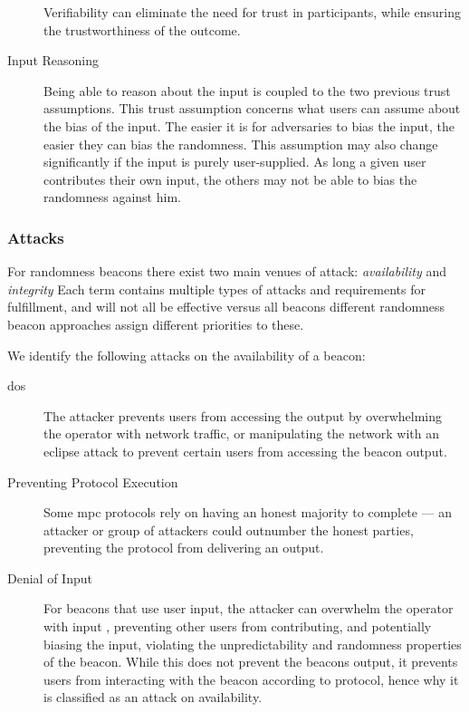 \begin{description}
        Verifiability can eliminate the need for trust in participants, while ensuring the trustworthiness of the outcome.

    \item[Input Reasoning]
        Being able to reason about the input is coupled to the two previous trust assumptions.
This trust assumption concerns what users can assume about the bias of the input.
        The easier it is for adversaries to bias the input, the easier they can bias the randomness.
        This assumption may also change significantly if the input is purely user-supplied.
As long a given user contributes their own input, the others may not be able to bias the randomness against him.

\end{description}


\subsubsection{Attacks}\label{ssub:security_objectives}
For randomness beacons there exist two main venues of attack: \emph{availability} and \emph{integrity}
Each term contains multiple types of attacks and requirements for fulfillment, and will not all be effective versus all beacons different randomness beacon approaches assign different priorities to these.

We identify the following attacks on the availability of a beacon:

\begin{description}
    \item[\Acrfull{dos}] The attacker prevents users from accessing the output by overwhelming the operator  with network traffic, or manipulating the network with an eclipse attack  to prevent certain users from accessing the beacon output.
    \item[Preventing Protocol Execution] Some \gls{mpc} protocols  rely on having an honest majority to complete  --- an attacker or group of attackers could outnumber the honest parties, preventing the protocol from delivering an output.
    \item[Denial of Input] For beacons that use user input, the attacker can overwhelm the operator with input , preventing other users from contributing, and potentially biasing the input, violating the unpredictability and randomness properties of the beacon.
        While this does not prevent the beacons output, it prevents users from interacting with the beacon according to protocol, hence why it is classified as an attack on availability.
\end{description}

